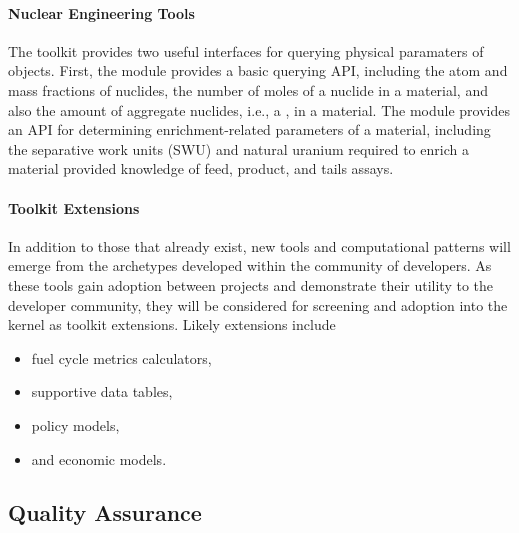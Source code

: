 \paragraph{Nuclear Engineering Tools}

The \Cyclus toolkit provides two useful interfaces for querying physical paramaters of 
objects. First, the  module
provides a basic querying \gls{API}, including the atom and mass fractions of
nuclides, the number of moles of a nuclide in a material, and also the amount of
aggregate nuclides, i.e., a , in a material. The
 module provides an \gls{API} for determining enrichment-related
parameters of a material, including the separative work units (SWU) and natural
uranium required to enrich a material provided knowledge of feed, product, and tails
assays.

\paragraph{Toolkit Extensions}

In addition to those that already exist, new tools and computational patterns will
emerge from the archetypes developed within the community of
developers. As these tools gain adoption between projects and demonstrate their
utility to the developer community, they will be considered for screening and
adoption into the kernel as toolkit extensions. Likely extensions include

\begin{itemize}
\item fuel cycle metrics calculators,
\item supportive data tables,
\item policy models,
\item and economic models.
\end{itemize}

\subsection{Quality Assurance}
%

%


